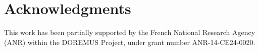 \documentclass[runningheads,a4paper]{llncs}
\begin{document}






\section*{Acknowledgments}
This work has been partially supported by the French National Research Agency (ANR) within the DOREMUS Project, under grant number ANR-14-CE24-0020.



\end{document}
